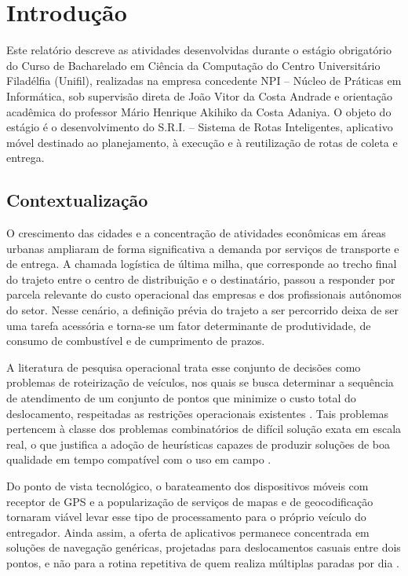 \chapter{Introdução}\label{cap:introducao}

Este relatório descreve as atividades desenvolvidas durante o estágio obrigatório do Curso de Bacharelado em Ciência da Computação do Centro Universitário Filadélfia (Unifil), realizadas na empresa concedente NPI -- Núcleo de Práticas em Informática, sob supervisão direta de João Vitor da Costa Andrade e orientação acadêmica do professor Mário Henrique Akihiko da Costa Adaniya. O objeto do estágio é o desenvolvimento do S.R.I. -- Sistema de Rotas Inteligentes, aplicativo móvel destinado ao planejamento, à execução e à reutilização de rotas de coleta e entrega.

\section{Contextualização}

O crescimento das cidades e a concentração de atividades econômicas em áreas urbanas ampliaram de forma significativa a demanda por serviços de transporte e de entrega. A chamada logística de última milha, que corresponde ao trecho final do trajeto entre o centro de distribuição e o destinatário, passou a responder por parcela relevante do custo operacional das empresas e dos profissionais autônomos do setor. Nesse cenário, a definição prévia do trajeto a ser percorrido deixa de ser uma tarefa acessória e torna-se um fator determinante de produtividade, de consumo de combustível e de cumprimento de prazos.

A literatura de pesquisa operacional trata esse conjunto de decisões como problemas de roteirização de veículos, nos quais se busca determinar a sequência de atendimento de um conjunto de pontos que minimize o custo total do deslocamento, respeitadas as restrições operacionais existentes \cite{cunha2000}. Tais problemas pertencem à classe dos problemas combinatórios de difícil solução exata em escala real, o que justifica a adoção de heurísticas capazes de produzir soluções de boa qualidade em tempo compatível com o uso em campo \cite{cormen2012}.

Do ponto de vista tecnológico, o barateamento dos dispositivos móveis com receptor de GPS e a popularização de serviços de mapas e de geocodificação tornaram viável levar esse tipo de processamento para o próprio veículo do entregador. Ainda assim, a oferta de aplicativos permanece concentrada em soluções de navegação genéricas, projetadas para deslocamentos casuais entre dois pontos, e não para a rotina repetitiva de quem realiza múltiplas paradas por dia \cite{sriVisao2025}.


